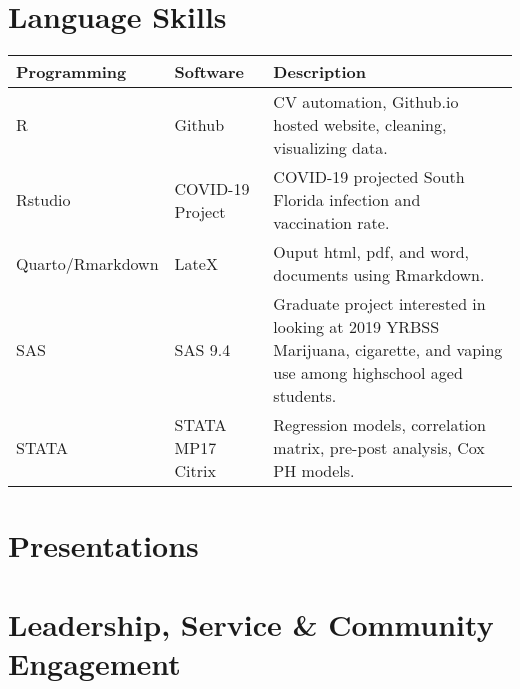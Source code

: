 \documentclass[11pt,a4paper,]{awesome-cv}
\begin{document}
\hypertarget{language-skills}{%
\section{Language Skills}\label{language-skills}}

\begin{table}[!h]
\centering
\begin{tabular}{ll>{\raggedright\arraybackslash}p{27em}}
\toprule
Programming & Software & Description\\
\midrule
R & Github & CV automation, Github.io hosted website, cleaning, visualizing data.\\
Rstudio & COVID-19 Project & COVID-19 projected South Florida infection and vaccination rate.\\
Quarto/Rmarkdown & LateX & Ouput html, pdf, and word, documents using Rmarkdown.\\
SAS & SAS 9.4 & Graduate project interested in looking at 2019 YRBSS Marijuana, cigarette, and vaping use among highschool aged students.\\
STATA & STATA MP17 Citrix & Regression models, correlation matrix, pre-post analysis, Cox PH models.\\
\bottomrule
\end{tabular}
\end{table}

\hypertarget{presentations}{%
\section{Presentations}\label{presentations}}

\hypertarget{leadership-service-community-engagement}{%
\section{Leadership, Service \& Community
Engagement}\label{leadership-service-community-engagement}}
\end{document}
